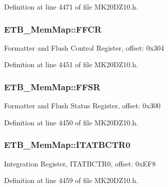 Definition at line 4471 of file M\+K20\+D\+Z10.\+h.

\subsubsection[{\texorpdfstring{F\+F\+CR}{FFCR}}]{ E\+T\+B\+\_\+\+Mem\+Map\+::\+F\+F\+CR}\hypertarget{struct_e_t_b___mem_map_a80b6d342085b83ee0a5ede7f9651bd59}{}\label{struct_e_t_b___mem_map_a80b6d342085b83ee0a5ede7f9651bd59}
Formatter and Flush Control Register, offset\+: 0x304 

Definition at line 4451 of file M\+K20\+D\+Z10.\+h.

\subsubsection[{\texorpdfstring{F\+F\+SR}{FFSR}}]{ E\+T\+B\+\_\+\+Mem\+Map\+::\+F\+F\+SR}\hypertarget{struct_e_t_b___mem_map_a329d4e3cc86aa6064657bb9a37096e31}{}\label{struct_e_t_b___mem_map_a329d4e3cc86aa6064657bb9a37096e31}
Formatter and Flush Status Register, offset\+: 0x300 

Definition at line 4450 of file M\+K20\+D\+Z10.\+h.

\subsubsection[{\texorpdfstring{I\+T\+A\+T\+B\+C\+T\+R0}{ITATBCTR0}}]{ E\+T\+B\+\_\+\+Mem\+Map\+::\+I\+T\+A\+T\+B\+C\+T\+R0}\hypertarget{struct_e_t_b___mem_map_a9da4a06848bfc47161b31c234eaaeb81}{}\label{struct_e_t_b___mem_map_a9da4a06848bfc47161b31c234eaaeb81}
Integration Register, I\+T\+A\+T\+B\+C\+T\+R0, offset\+: 0x\+E\+F8 

Definition at line 4459 of file M\+K20\+D\+Z10.\+h.

